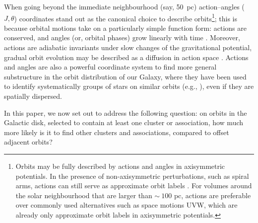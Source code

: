 \documentclass[twocolumn]{aastex631}
\begin{document}
When going beyond the immediate neighbourhood (say, 50~pc)  action--angles ($J,\theta$) coordinates stand out as the canonical choice to describe orbits\footnote{Orbits may be fully described by actions and angles in axisymmetric potentials. In the presence of non-axisymmetric perturbations, such as spiral arms, actions can still serve as approximate orbit labels \citep{Trick_2017}. For volumes around the solar neighbourhood that are larger than $\sim~100$ pc, actions are preferable over commonly used alternatives such as space motions UVW, which are already only approximate orbit labels in axisymmetric potentials.}; this is because orbital motions take on a particularly simple function form: actions are conserved, and angles (or, orbital phases) grow linearly with time \citep{binney2008}. Moreover, actions are adiabatic invariants under slow changes of the gravitational potential, gradual orbit evolution may be described as a diffusion in action space \citep{2015MNRAS.449.3479S}. Actions and angles are also a powerful coordinate system to find more general substructure in the orbit distribution of our Galaxy, where they have been used to identify systematically groups of stars on similar orbits (e.g., \citet{2019MNRAS.484.3291T,2020MNRAS.495.4098C}), even if they are spatially dispersed. 

In this paper, we now set out to address the following question: on orbits in the Galactic disk, selected to contain at least one cluster or association, how much more likely is it to find other clusters and associations, compared to offset adjacent orbits? 
\end{document}
